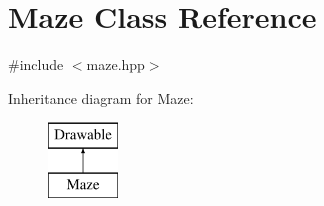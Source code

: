 \hypertarget{class_maze}{}\section{Maze Class Reference}
\label{class_maze}


{\ttfamily \#include $<$maze.\+hpp$>$}

Inheritance diagram for Maze\+:\begin{figure}[H]
\begin{center}
\leavevmode
\includegraphics[height=2.000000cm]{class_maze}
\end{center}
\end{figure}
